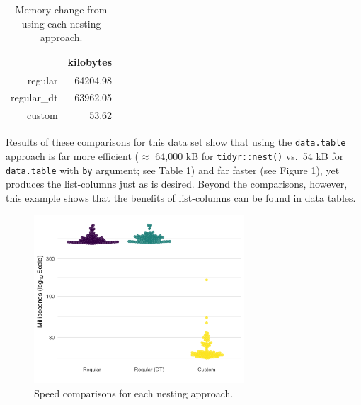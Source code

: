 \documentclass[doc]{apa6}
\begin{document}
\begin{table}[tb]
\centering
\caption{Memory change from using each nesting approach.} 
\begin{tabular}{rr}
  \hline
 & kilobytes \\ 
  \hline
regular & 64204.98 \\ 
  regular\_dt & 63962.05 \\ 
  custom & 53.62 \\ 
   \hline
\end{tabular}
\end{table}

Results of these comparisons for this data set show that using the \texttt{data.table} approach is far more efficient (\(\approx\) 64,000 kB for \texttt{tidyr::nest()} vs.~54 kB for \texttt{data.table} with \texttt{by} argument; see Table 1) and far faster (see Figure 1), yet produces the list-columns just as is desired. Beyond the comparisons, however, this example shows that the benefits of list-columns can be found in data tables.

\begin{figure}[htb]
  \centering
  \includegraphics[width=0.7\textwidth]{timings.png}
  \caption{Speed comparisons for each nesting approach.}
\end{figure}
\end{document}
